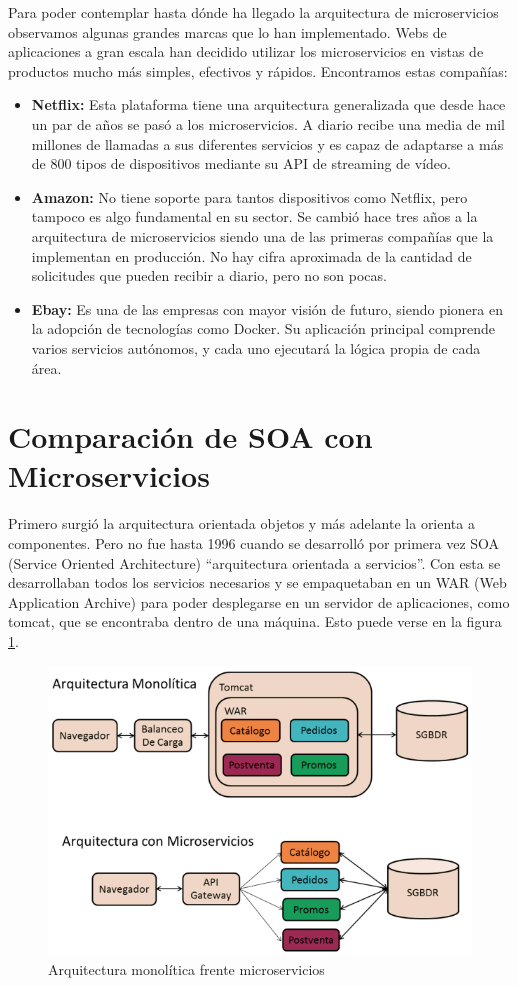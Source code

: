 \documentclass[12pt]{report} %
\begin{document}
Para poder contemplar hasta dónde ha llegado la arquitectura de microservicios observamos algunas grandes marcas que lo han implementado. Webs de aplicaciones a gran escala han decidido utilizar los microservicios en vistas de productos mucho más simples, efectivos y rápidos. Encontramos estas compañías:
\begin{itemize}
	\item \textbf{Netflix:} Esta plataforma tiene una arquitectura generalizada que desde hace un par de años se pasó a los microservicios. A diario recibe una media de mil millones de llamadas a sus diferentes servicios y es capaz de adaptarse a más de 800 tipos de dispositivos mediante su API de streaming de vídeo.
	\item \textbf{Amazon:} No tiene soporte para tantos dispositivos como Netflix, pero tampoco es algo fundamental en su sector. Se cambió hace tres años a la arquitectura de microservicios siendo una de las primeras compañías que la implementan en producción. No hay cifra aproximada de la cantidad de solicitudes que pueden recibir a diario, pero no son pocas. 
	\item \textbf{Ebay:} Es una de las empresas con mayor visión de futuro, siendo pionera en la adopción de tecnologías como Docker. Su aplicación principal comprende varios servicios autónomos, y cada uno ejecutará la lógica propia de cada área.
\end{itemize}




\section{Comparación de SOA con Microservicios}
Primero surgió la arquitectura orientada objetos y más adelante la orienta a componentes. Pero no fue hasta 1996 cuando se desarrolló por primera vez SOA (Service Oriented Architecture) “arquitectura orientada a servicios”. Con esta se desarrollaban todos los servicios necesarios y se empaquetaban en un WAR (Web Application Archive) para poder desplegarse en un servidor de aplicaciones, como tomcat, que se encontraba dentro de una máquina. Esto puede verse en la figura \ref{fig:soavsmicroservicios}.

\begin{figure}
	\centering
	\includegraphics[width=0.7\linewidth]{imagenes/soavsmicroservicios}
	\caption{Arquitectura monolítica frente microservicios}
	\label{fig:soavsmicroservicios}
\end{figure}
\end{document}
